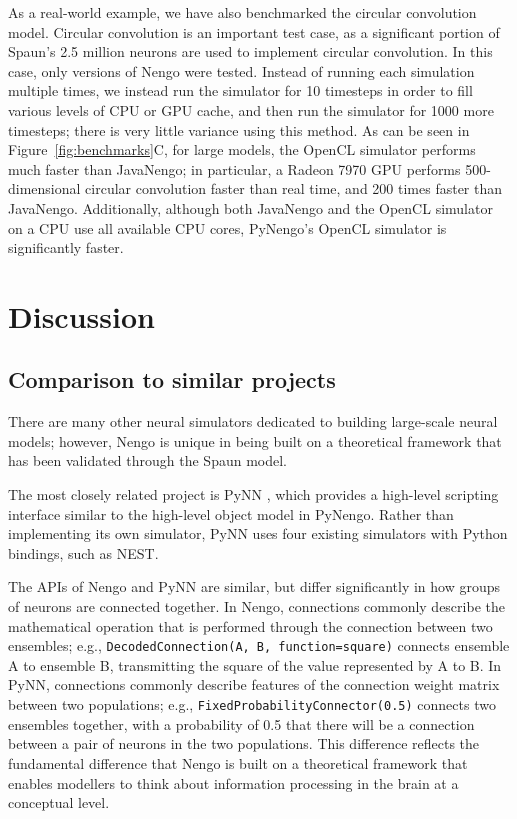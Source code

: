 \documentclass{frontiersSCNS}
\begin{document}
As a real-world example,
we have also benchmarked
the circular convolution model.
Circular convolution is an important test case,
as a significant portion of Spaun's
2.5 million neurons are used to
implement circular convolution.
In this case, only versions of Nengo
were tested.
Instead of running each simulation multiple times,
we instead run the simulator for 10 timesteps
in order to fill various levels of CPU or GPU cache,
and then run the simulator for 1000 more timesteps;
there is very little variance using this method.
As can be seen in Figure~\ref{fig:benchmarks}C,
for large models, the OpenCL simulator
performs much faster than JavaNengo;
in particular, a Radeon 7970 GPU performs 500-dimensional
circular convolution faster than real time,
and 200 times faster than JavaNengo.
Additionally, although both JavaNengo
and the OpenCL simulator on a CPU
use all available CPU cores,
PyNengo's OpenCL simulator is significantly faster.

\clearpage

\section{Discussion}

\subsection{Comparison to similar projects}

There are many other neural simulators
dedicated to building large-scale neural models;
however, Nengo is unique in being built
on a theoretical framework
that has been validated
through the Spaun model.

The most closely related project is PyNN
\citep{davison2008},
which provides a high-level scripting
interface similar to the
high-level object model in PyNengo.
Rather than implementing its
own simulator, PyNN uses four existing
simulators with Python bindings,
such as NEST.

The APIs of Nengo and PyNN are similar,
but differ significantly
in how groups of neurons are connected together.
In Nengo, connections commonly describe
the mathematical operation that is performed
through the connection between
two ensembles;
e.g., \texttt{DecodedConnection(A, B,
function=square)} connects ensemble A
to ensemble B, transmitting the square of
the value represented by A to B.
In PyNN, connections commonly describe
features of the connection weight matrix
between two populations;
e.g., \texttt{FixedProbabilityConnector(0.5)}
connects two ensembles together,
with a probability of 0.5
that there will be a connection
between a pair of neurons in the two populations.
This difference reflects the
fundamental difference that Nengo
is built on a theoretical framework
that enables modellers to think
about information processing in the brain
at a conceptual level.
\end{document}
